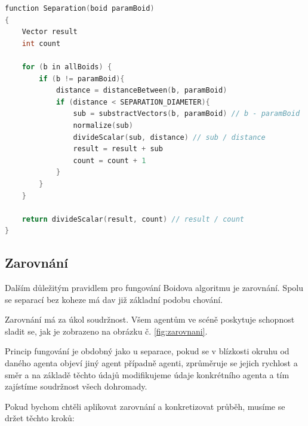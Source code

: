\documentclass[czech,public,dept460,male,cpdeclaration]{diploma}
\begin{document}
\begin{lstlisting}[language=c++,label=src:Separation pseudocode,caption=Pseudokód pro separaci (Zdroj: vlastní)]
function Separation(boid paramBoid)
{
	Vector result
	int count
	
	for (b in allBoids) {
		if (b != paramBoid){
			distance = distanceBetween(b, paramBoid)
			if (distance < SEPARATION_DIAMETER){
				sub = substractVectors(b, paramBoid) // b - paramBoid
				normalize(sub)
				divideScalar(sub, distance) // sub / distance
				result = result + sub
				count = count + 1
			}
		}
	}
	
	return divideScalar(result, count) // result / count
}
\end{lstlisting}

\subsection{Zarovnání}\label{sec:zarovnani}
Dalším důležitým pravidlem pro fungování Boidova algoritmu je zarovnání. Spolu se separací bez koheze má dav již základní podobu chování. 

Zarovnání má za úkol soudržnost. Všem agentům ve scéně poskytuje schopnost sladit se, jak je zobrazeno na obrázku č. \ref{fig:zarovnani}. 

Princip fungování je obdobný jako u separace, pokud se v blízkosti okruhu od daného agenta objeví jiný agent případně agenti, zprůměruje se jejich rychlost a směr a na základě těchto údajů modifikujeme údaje konkrétního agenta a tím zajístíme soudržnost všech dohromady. 

Pokud bychom chtěli aplikovat zarovnání a konkretizovat průběh, musíme se držet těchto kroků:
\end{document}
